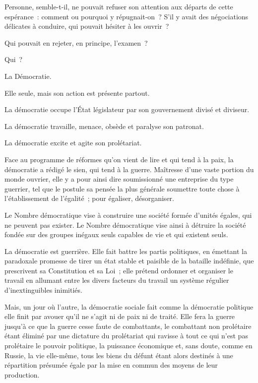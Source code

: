 \documentclass[french,twoside]{book} %
\begin{document}
Personne, semble-t-il, ne pouvait refuser son attention aux départs de cette espérance : comment ou pourquoi y répugnait-on ? S’il y avait des négociations délicates à conduire, qui pouvait hésiter à les ouvrir ?\par
Qui pouvait en rejeter, en principe, l’examen ?\par
Qui ?\par
La Démocratie.\par
Elle seule, mais son action est présente partout.\par
La démocratie occupe l’État législateur par son gouvernement divisé et diviseur.\par
La démocratie travaille, menace, obsède et paralyse son patronat.\par
La démocratie excite et agite son prolétariat.\par
Face au programme de réformes qu’on vient de lire et qui tend à la paix, la démocratie a rédigé le sien, qui tend à la guerre. Maîtresse d’une vaste portion du monde ouvrier, elle y a pour ainsi dire soumissionné une entreprise du type guerrier, tel que le postule sa pensée la plus générale soumettre toute chose à l’établissement de l’égalité ; pour égaliser, désorganiser.\par
Le Nombre démocratique vise à construire une société formée d’unités égales, qui ne peuvent pas exister. Le Nombre démocratique vise ainsi à détruire la société fondée sur des groupes inégaux seuls capables de vie et qui existent seuls.\par
La démocratie est guerrière. Elle fait battre les partis politiques, en émettant la paradoxale promesse de tirer un état stable et paisible de la bataille indéfinie, que prescrivent sa Constitution et sa Loi ; elle prétend ordonner et organiser le travail en allumant entre les divers facteurs du travail un système régulier d’inextinguibles inimitiés.\par
Mais, un jour où l’autre, la démocratie sociale fait comme la démocratie politique elle finit par avouer qu’il ne s’agit ni de paix ni de traité. Elle fera la guerre jusqu’à ce que la guerre cesse faute de combattants, le combattant non prolétaire étant éliminé par une dictature du prolétariat qui ravisse à tout ce qui n’est pas prolétaire le pouvoir politique, la puissance économique et, sans doute, comme en Russie, la vie elle-même, tous les biens du défunt étant alors destinés à une répartition présumée égale par la mise en commun des moyens de leur production.\par
\end{document}
